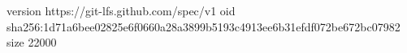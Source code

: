 version https://git-lfs.github.com/spec/v1
oid sha256:1d71a6bee02825e6f0660a28a3899b5193c4913ee6b31efdf072be672bc07982
size 22000
